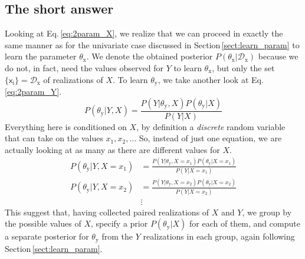 \documentclass[]{report}
\begin{document}
\subsection{The short answer}
Looking at Eq.\,\ref{eq:2param_X}, we realize that we can proceed in exactly the same manner as for the univariate case discussed in Section\,\ref{sect:learn_param} to learn the parameter $\theta_\mathrm{x}$. We denote the obtained posterior $P(\theta_\mathrm{x}|\mathcal{D}_\mathrm{x})$ because we do not, in fact, need the values observed for $Y$ to learn $\theta_\mathrm{x}$, but only the set $\{\mathsf{x}_\mathrm{i}\} = \mathcal{D}_\mathrm{x}$ of realizations of $X$. To learn $\theta_\mathrm{y}$, we take another look at Eq.\,\ref{eq:2param_Y}.
\begin{equation*}
P(\theta_\mathrm{y}|Y, X) = \frac{P(Y|\theta_\mathrm{y}, X)P(\theta_\mathrm{y}|X)}{P(Y|X)}
\end{equation*}
Everything here is conditioned on $X$, by definition a \emph{discrete} random variable that can take on the values $x_1, x_2, \ldots$ So, instead of just one equation, we are actually looking at as many as there are different values for $X$.
\begin{align}
P(\theta_\mathrm{y}|Y, X=x_1) &= \frac{P(Y|\theta_\mathrm{y}, X=x_1)P(\theta_\mathrm{y}|X=x_1)}{P(Y|X=x_1)} \nonumber \\
P(\theta_\mathrm{y}|Y, X=x_2) &= \frac{P(Y|\theta_\mathrm{y}, X=x_2)P(\theta_\mathrm{y}|X=x_2)}{P(Y|X=x_2)} \\
 &\vdots \nonumber
\end{align}
This suggest that, having collected paired realizations of $X$ and $Y$, we group by the possible values of $X$, specify a prior $P(\theta_\mathrm{y}|X)$ for each of them, and compute a separate posterior for $\theta_\mathrm{y}$ from the $Y$ realizations in each group, again following Section\,\ref{sect:learn_param}.
\end{document}
